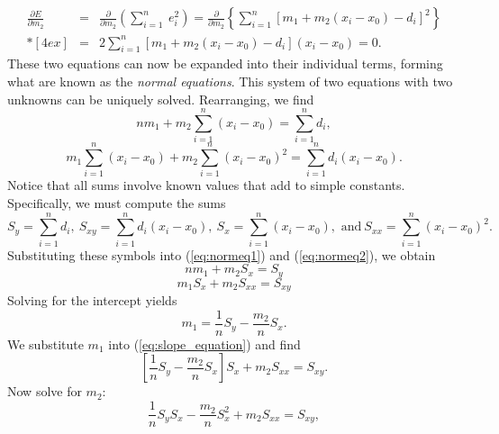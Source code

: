 \begin{equation}
\begin{array}{rcl}
\displaystyle
\frac{\partial E}{\partial m_2} & = & \displaystyle \frac{\partial}{\partial m_2} \left ( \sum^n_{i=1} \ e^2_i \right ) = \frac{\partial}{\partial m_2} \left \{ \sum^n_{i=1} \left [ m_1 + m_2 (x_i - x_0) - d_i \right ] ^2 \right \}\\*[4ex]
 & = & \displaystyle 2 \sum^n_{i=1} \left [ m_1 + m_2 (x_i - x_0) - d_i \right ](x_i - x_0) = 0.
\end{array}
\end{equation}
These two equations can now be expanded into their individual terms, forming what are known as 
the \emph{normal equations}.  This system of two equations with two unknowns can be uniquely 
solved. Rearranging, we find
\begin{equation}
nm_1 + m_2 \sum^n_{i=1} (x_i - x_0) = \sum^n_{i=1} d _i,
\label{eq:normeq1}
\end{equation}
\begin{equation}
m_1 \sum^n_{i=1} (x_i - x_0) + m_2 \sum^n_{i=1} (x_i - x_0)^2 = \sum^n_{i=1} d_i (x_i - x_0).
\label{eq:normeq2}
\end{equation}
Notice that all sums involve known values that add to simple constants. 
Specifically, we must compute the sums
\begin{equation}
S_y = \sum^n_{i=1} d_i, \ S_{xy} = \sum^n_{i=1}d_i (x_i - x_0), \ S_x = \sum^n_{i=1}(x_i - x_0), \mbox{ and} \ 
S_{xx} = \sum^n_{i=1}(x_i - x_0)^2.
\end{equation}
Substituting these symbols into (\ref{eq:normeq1}) and (\ref{eq:normeq2}), we obtain
\begin{equation}
nm_1 + m_2 S_x = S_y
\end{equation}
\begin{equation}
m_1 S_x + m_2 S_{xx} = S_{xy}
\label{eq:slope_equation}
\end{equation}
Solving for the intercept yields
\begin{equation}
m_1 = \frac{1}{n} S_y - \frac{m_2}{n} S_x.
\label{eq:intercept_equation}
\end{equation}
We substitute $m_1$ into (\ref{eq:slope_equation}) and find
\begin{equation}
\left [ \frac{1}{n} S_y - \frac{m_2}{n} S_x \right ] S_x + m_2 S_{xx} = S_{xy}.
\end{equation}
Now solve for $m_2$:
\begin{equation}
\frac{1}{n} S_y S_x - \frac{m_2}{n} S_x^2 + m_2 S_{xx} = S_{xy},
\end{equation}

